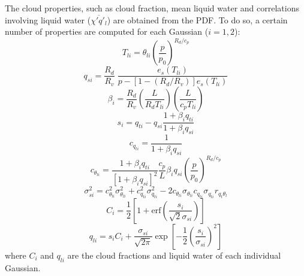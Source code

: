 \documentclass[11pt,fleqn]{article}
\begin{document}
The cloud properties, such as cloud fraction, mean liquid water
and correlations involving liquid water ($\overline{\chi'q'_l}$)
are obtained from the PDF. To do so, a certain number of properties
are computed for each Gaussian ($i=1,2$):
%
\begin{equation}
T_{li} = \theta_{li} \left( \frac{p}{p_0} \right)^{R_d/c_p}
\end{equation}
%
\begin{equation}
\label{eq:qs_def}
q_{si} = \frac{R_d}{R_v}\; \frac{e_s(T_{li})}{p-[1-(R_d/R_v)] e_s(T_{li})}
\end{equation}
%
\begin{equation}
\label{eq:beta_def}
\beta_i =
\frac{R_d}{R_v} \left( \frac{L}{R_d T_{li}} \right) 
\left( \frac{L}{c_p T_{li}} \right)
\end{equation}
%
\begin{equation}
\label{eq:s_def}
s_i = q_{ti} - q_{si}\frac{1+\beta_i q_{ti}}{1+\beta_i q_{si}}
\end{equation}
%
\begin{equation}
c_{q_{ti}} = \frac{1}{1 + \beta_i q_{si}}
\end{equation}
%
\begin{equation}
c_{\theta_{li}} 
= \frac{1 + \beta_i q_{ti}}
       {[1 + \beta_i q_{si}]^2}
  \frac{c_p}{L} \beta_i q_{si}
  \left( \frac{p}{p_0} \right)^{R_d/c_p}
\end{equation}
%
\begin{equation}
\sigma_{si}^2 
= c_{\theta_{li}}^2 \sigma_{\theta_{li}}^2 
+ c_{q_{ti}}^2 \sigma_{q_{ti}}^2
- 2 c_{\theta_{li}} \sigma_{\theta_{li}} 
    c_{q_{ti}} \sigma_{q_{ti}} r_{q_t \theta_l}
\end{equation}
%
\begin{equation}
\label{eq:C_gauss}
C_i = \frac{1}{2} 
      \left[ 
        1 + \mathrm{erf} \left( \frac{s_i}{\sqrt{2}\sigma_{si}} \right) 
      \right]
\end{equation}
%
\begin{equation}
\label{eq:ql_gauss}
q_{li} 
= s_i C_i
+ \frac{\sigma_{si}}{\sqrt{2\pi}} 
  \exp \left[ 
         -\frac{1}{2}\left( \frac{s_i}{\sigma_{si}} \right)^2 
       \right]
\end{equation}
%
where $C_i$ and $q_{li}$ are the cloud fractions and liquid water of
each individual Gaussian.
\end{document}

